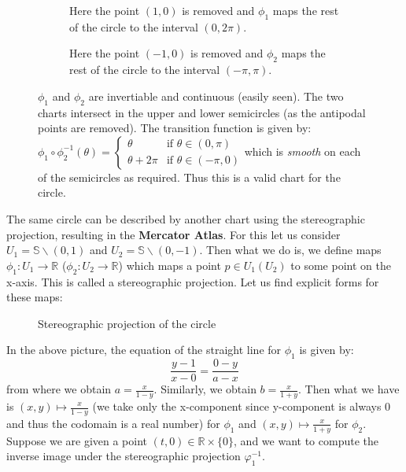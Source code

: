 \begin{figure}[H]
  \centering
  \begin{subfigure}[b]{0.45\textwidth}
    \centering
    
    \caption{Here the point $(1,0)$ is removed and $\phi_1$ maps the rest of the circle to the interval $(0,2\pi)$.}
    \label{fig:circchart1}
  \end{subfigure}
  \hfill
  \begin{subfigure}[b]{0.45\textwidth}
    \centering
    
    \caption{Here the point $(-1,0)$ is removed and $\phi_2$ maps the rest of the circle to the interval $(-\pi,\pi)$.}
    \label{fig:circchart2}
  \end{subfigure}
  \caption{$\phi_1$ and $\phi_2$ are invertiable and continuous (easily seen).  The two charts intersect in the upper and lower semicircles (as the antipodal points are removed). The transition function is given by:
  \(\phi_1 \circ \phi_2^{-1}(\theta) = \begin{cases}   \theta  & \text{if } \theta\in (0, \pi) \\  \theta+2\pi & \text{if } \theta \in (-\pi, 0) \end{cases}\)which is \textit{smooth} on each of the semicircles as required. Thus this is a valid chart for the circle.}  
  
\end{figure}
\noindent
The same circle can be described by another chart using the stereographic projection, resulting in the \textbf{Mercator Atlas}. For this let us consider $U_1 = \mathbb{S}\backslash(0,1)$ and $U_2 = \mathbb{S}\backslash(0,-1)$. Then what we do is, we define maps $\phi_1: U_1 \rightarrow \mathbb{R}$ ($\phi_2:U_2 \rightarrow \mathbb{R}$) which maps a point $p\in U_1(U_2)$ to some point on the x-axis. This is called a stereographic projection.  Let us find explicit forms for these maps:
\begin{figure}[H]
  \centering
  
  \caption{Stereographic projection of the circle} 
\end{figure}
\noindent
In the above picture, the equation of the straight line for $\phi_1$ is given by:
$$\frac{y-1}{x-0} = \frac{0-y}{a-x}$$ from where we obtain $a=\frac{x}{1-y}$. Similarly, we obtain $b = \frac{x}{1+y}$. Then what we have is $(x,y) \mapsto \frac{x}{1-y}$ (we take only the x-component since y-component is always 0 and thus the codomain is a real number) for $\phi_1$ and $(x,y) \mapsto \frac{x}{1+y}$ for $\phi_2$.  Suppose we are given a point \( (t, 0) \in \mathbb{R} \times \{0\} \), and we want to compute the inverse image under the stereographic projection \( \varphi_1^{-1} \).\\[0.2cm]
